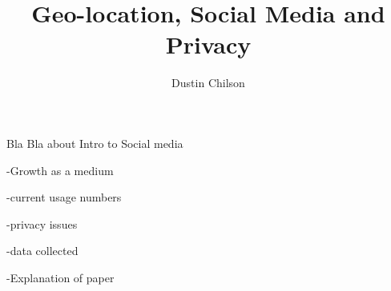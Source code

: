 \documentclass[man]{apa}%
\title{Geo-location, Social Media and Privacy}
\author{Dustin Chilson}
\affiliation{Information Security Intelligence \\ Ferris State University}
\begin{document}
 
\maketitle  
Bla Bla about Intro to Social media 

-Growth as a medium 

-current usage numbers 

-privacy issues 

-data collected

-Explanation of paper









\end{document}
